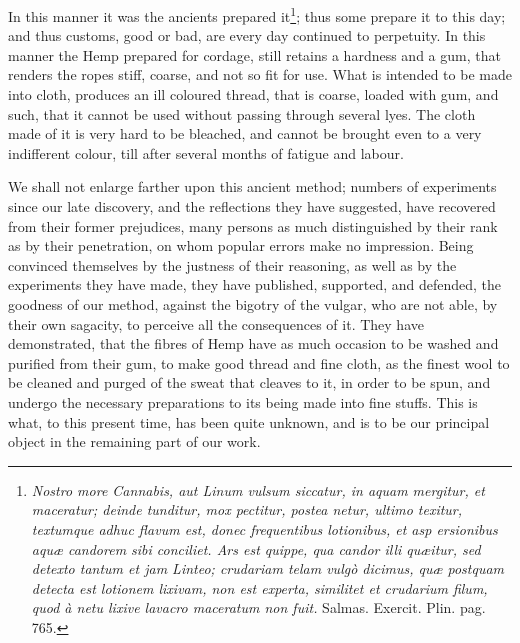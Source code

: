 \documentclass[a4paper, 11pt, oneside, polutonikogreek, english]{article}
\begin{document}
In this manner it was the ancients prepared it\footnote{\emph{Nostro more Cannabis, aut Linum vulsum siccatur, in aquam mergitur, et maceratur; deinde tunditur, mox pectitur, postea netur, ultimo texitur, textumque adhuc flavum est, donec frequentibus lotionibus, et asp ersionibus aquæ candorem sibi conciliet. Ars est quippe, qua candor illi quæitur, sed detexto tantum et jam Linteo; crudariam telam vulgò dicimus, quæ postquam detecta est lotionem lixivam, non est experta, similitet et crudarium filum, quod à netu lixive lavacro maceratum non fuit.} Salmas. Exercit. Plin. pag. 765.}; thus some prepare it to this day; and thus customs, good or bad, are every day continued to perpetuity. In this manner the Hemp prepared for cordage, still retains a hardness and a gum, that renders the ropes stiff, coarse, and not so fit for use. What is intended to be made into cloth, produces an ill coloured thread, that is coarse, loaded with gum, and such, that it cannot be used without passing through several lyes. The cloth made of it is very hard to be bleached, and cannot be brought even to a very indifferent colour, till after several months of fatigue and labour.

We shall not enlarge farther upon this ancient method; numbers of experiments since our late discovery, and the reflections they have suggested, have recovered from their former prejudices, many persons as much distinguished by their rank as by their penetration, on whom popular errors make no impression. Being convinced themselves by the justness of their reasoning, as well as by the experiments they have made, they have published, supported, and defended, the goodness of our method, against the bigotry of the vulgar, who are not able, by their own sagacity, to perceive all the consequences of it. They have demonstrated, that the fibres of Hemp have as much occasion to be washed and purified from their gum, to make good thread and fine cloth, as the finest wool to be cleaned and purged of the sweat that cleaves to it, in order to be spun, and undergo the necessary preparations to its being made into fine stuffs. This is what, to this present time, has been quite unknown, and is to be our principal object in the remaining part of our work.
\end{document}
